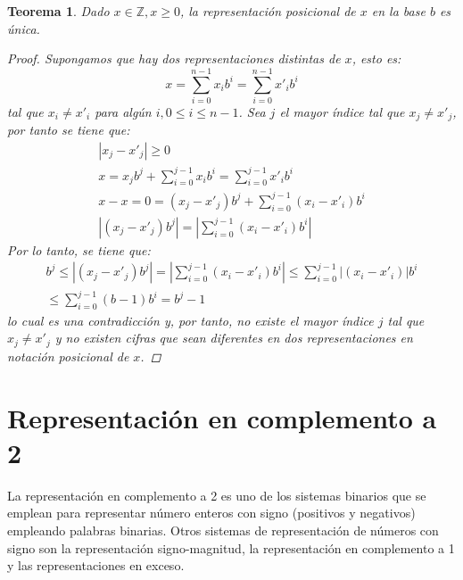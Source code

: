 \documentclass[spanish,a4paper,12pt,titlepage]{article}
\newtheorem{theorem}{Teorema}%
\theoremstyle{definition}
\theoremstyle{remark}
\newcommand{\bbZ}{\mathbb{Z}}
\begin{document}
\begin{theorem}\label{theorem-pos-uniq}
    Dado $x \in \bbZ, x \ge 0$, la representación posicional de $x$ en
    la base $b$ es única.
    \begin{proof}
        Supongamos que hay dos representaciones distintas de $x$, esto es:
        \[
            x = \sum_{i=0}^{n-1} x_i b^i = \sum_{i=0}^{n-1} x'_i b^i
        \]
        tal que $x_i \neq x'_i$ para algún $i, 0 \le i \le n-1$. Sea $j$ el
        mayor índice tal que $x_j \neq x'_j$, por tanto se tiene que:
        \begin{align*}
            |x_j-x'_j| \ge 0 \\
            x = x_j b^j + \sum_{i=0}^{j-1} x_i b^i
                = \sum_{i=0}^{j-1} x'_i b^i \\
            x-x = 0 = (x_j-x'_j) b^j + \sum_{i=0}^{j-1} (x_i-x'_i)b^i \\
            \left| (x_j-x'_j) b^j \right| =
                \left| \sum_{i=0}^{j-1} (x_i-x'_i)b^i \right|
        \end{align*}
        Por lo tanto, se tiene que:
        \begin{align*}
            b^j \le \left| (x_j-x'_j) b^j \right|
                = \left| \sum_{i=0}^{j-1} (x_i-x'_i)b^i \right| \le
                \sum_{i=0}^{j-1} |(x_i-x'_i)|b^i \\
                \le \sum_{i=0}^{j-1} (b-1)b^i = b^j - 1
        \end{align*}
        lo cual es una contradicción y, por tanto, no existe el mayor índice
        $j$ tal que $x_j \neq x'_j$ y no existen cifras que sean diferentes en
        dos representaciones en notación posicional de $x$.
    \end{proof}
\end{theorem}

\section{Representación en complemento a 2}

La representación en complemento a 2 es uno de los sistemas binarios que se emplean para representar número enteros con signo (positivos y negativos) empleando palabras binarias. Otros sistemas de representación de números con signo son la representación signo-magnitud, la representación en complemento a 1 y las representaciones en exceso.
\end{document}
